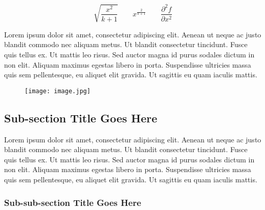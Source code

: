 \documentclass{csmagazine}
\begin{document}
\begin{flushleft}

\begin{equation}
\sqrt{\frac{x^2}{k+1}}\qquad
x^\frac{2}{k+1}\qquad
\frac{\partial^2f}{\partial x^2}
\end{equation}

Lorem ipsum dolor sit amet, consectetur adipiscing elit. Aenean ut neque ac justo blandit commodo nec aliquam metus. Ut blandit consectetur tincidunt. Fusce quis tellus ex. Ut mattis leo risus. Sed auctor magna id purus sodales dictum in non elit. Aliquam maximus egestas libero in porta. Suspendisse ultricies massa quis sem pellentesque, eu aliquet elit gravida. Ut sagittis eu quam iaculis mattis.


\begin{figure}[ht!]
	\begin{center}	
	\texttt{[image: image.jpg]}
	\end{center}
\end{figure}

\subsection*{Sub-section Title Goes Here}

Lorem ipsum dolor sit amet, consectetur adipiscing elit. Aenean ut neque ac justo blandit commodo nec aliquam metus. Ut blandit consectetur tincidunt. Fusce quis tellus ex. Ut mattis leo risus. Sed auctor magna id purus sodales dictum in non elit. Aliquam maximus egestas libero in porta. Suspendisse ultricies massa quis sem pellentesque, eu aliquet elit gravida. Ut sagittis eu quam iaculis mattis.

\subsubsection*{Sub-sub-section Title Goes Here}


\end{flushleft}
\end{document}
